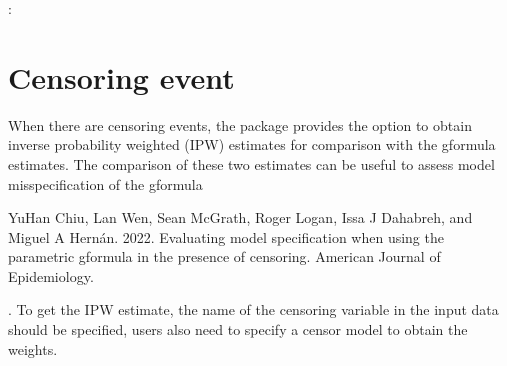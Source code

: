 \documentclass[letterpaper,10pt,english]{sphinxmanual}
\begin{document}
\begin{sphinxVerbatim}[commandchars=\\\{\}]
        
      \PYG{p}{[} \PYG{p}{]}
      \PYG{p}{[} \PYG{p}{]}
     
     
      
\end{sphinxVerbatim}

\sphinxAtStartPar
{}:
\begin{quote}

\end{quote}


\section{Censoring event}
\label{\detokenize{Specifications/Censoring event:censoring-event}}\label{\detokenize{Specifications/Censoring event:id1}}\label{\detokenize{Specifications/Censoring event::doc}}
\sphinxAtStartPar
When there are censoring events, the package provides the option to obtain inverse probability weighted (IPW) estimates
for comparison with the g\sphinxhyphen{}formula estimates. The comparison of these two estimates can be useful to assess model misspecification
of the g\sphinxhyphen{}formula \sphinxstepexplicit %
\begin{footnote}[1]\label{\thesphinxscope.1}%
\sphinxAtStartFootnote
Yu\sphinxhyphen{}Han Chiu, Lan Wen, Sean McGrath, Roger Logan, Issa J Dahabreh, and Miguel A Hernán. 2022. Evaluating model specification when using the parametric g\sphinxhyphen{}formula in the presence of censoring. American Journal of Epidemiology.
%
\end{footnote}.
To get the IPW estimate, the name of the censoring variable in the input data should be specified,
users also need to specify a censor model to obtain the weights.
\end{document}
